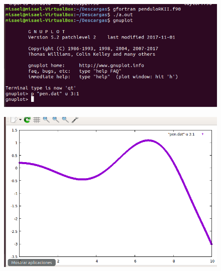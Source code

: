 \documentclass[12pt,a4paper]{article}
\begin{document}
\begin{figure}[h!]
    \centering
    \includegraphics[scale=0.8]{1.PNG}
\end{figure}

\begin{figure}[h!]
    \centering
    \includegraphics[scale=0.8]{RKII.PNG}
\end{figure}

\newpage

\vspace{5cm}
\end{document}
